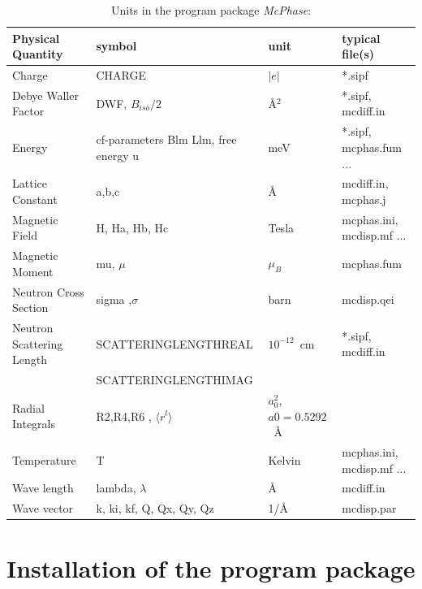 \documentclass[twoside]{article}
\newcommand{\prg}{\sl}
\begin{document}
\begin{table}[thb] 
\begin{center}  
\caption {Units in the program package 
{\prg McPhase}:}   
\label{units}   
\begin{tabular} 
{l|l|l|l}
Physical Quantity  & symbol                                         & unit      & typical file(s)     \\
\hline
Charge             &  CHARGE                                        & $|e|$       & *.sipf \\
Debye Waller Factor & DWF, $B_{iso}/2$                              & \AA$^2$   & *.sipf, mcdiff.in \\ 
Energy             & cf-parameters Blm Llm, free energy u           & meV       & *.sipf, mcphas.fum ...  \\
Lattice Constant   & a,b,c                                          & \AA        & mcdiff.in, mcphas.j \\
Magnetic Field     & H, Ha, Hb, Hc                                  & Tesla     & mcphas.ini, mcdisp.mf ...    \\
Magnetic Moment    &  mu, $\mu$                                     & $\mu_B$   & mcphas.fum \\
Neutron Cross Section &  sigma ,$\sigma$                            & barn      & mcdisp.qei \\
Neutron Scattering Length & SCATTERINGLENGTHREAL & $10^{-12}$~cm & *.sipf, mcdiff.in \\
  & SCATTERINGLENGTHIMAG & & \\
Radial Integrals   & R2,R4,R6 , $\langle r^l \rangle$               & $a_0^2$, $a0=0.5292$~\AA \\ 
Temperature        & T                                              & Kelvin    & mcphas.ini, mcdisp.mf ... \\
Wave length        & lambda, $\lambda$                              & \AA       & mcdiff.in \\
Wave vector        & k, ki, kf, Q, Qx, Qy, Qz                       & 1/\AA    & mcdisp.par \\
\end{tabular}
\end{center}
\end{table}

\clearpage
\section{Installation of the program package}




\newpage


\newpage
\printindex

\end{document}
